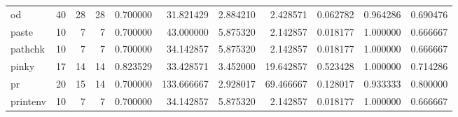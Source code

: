 \begin{tabular}{lrrrrrrrrrr}
od        &                                      40 &                 28 &                                28 &                                   0.700000 &                              31.821429 &                                     2.884210 &                          2.428571 &                                0.062782 &                           0.964286 &                                           0.690476 \\
paste     &                                      10 &                  7 &                                 7 &                                   0.700000 &                              43.000000 &                                     5.875320 &                          2.142857 &                                0.018177 &                           1.000000 &                                           0.666667 \\
pathchk   &                                      10 &                  7 &                                 7 &                                   0.700000 &                              34.142857 &                                     5.875320 &                          2.142857 &                                0.018177 &                           1.000000 &                                           0.666667 \\
pinky     &                                      17 &                 14 &                                14 &                                   0.823529 &                              33.428571 &                                     3.452000 &                         19.642857 &                                0.523428 &                           1.000000 &                                           0.714286 \\
pr        &                                      20 &                 15 &                                14 &                                   0.700000 &                             133.666667 &                                     2.928017 &                         69.466667 &                                0.128017 &                           0.933333 &                                           0.800000 \\
printenv  &                                      10 &                  7 &                                 7 &                                   0.700000 &                              34.142857 &                                     5.875320 &                          2.142857 &                                0.018177 &                           1.000000 &                                           0.666667 \\

\end{tabular}
